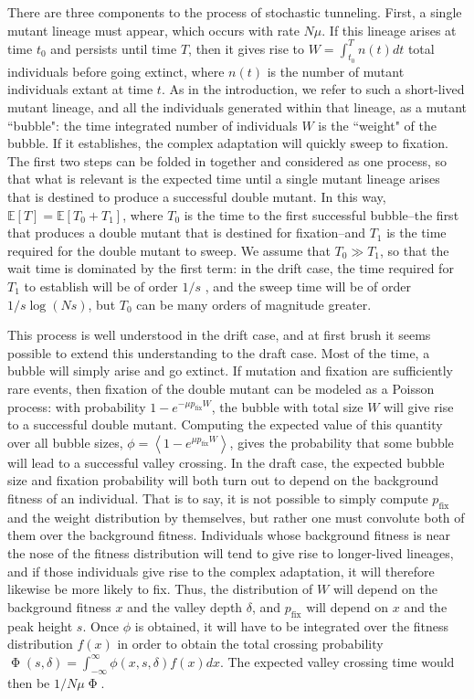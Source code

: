 \documentclass[10pt,twocolumn,twoside]{gsajnl}
\newcommand{\pfix}{p_{\mathrm{fix}}}
\begin{document}
\begin{spacing}{1.5}
There are three components to the process of stochastic tunneling.
First, a single mutant lineage must appear, which occurs with rate $N\mu$.
If this lineage arises at time $t_0$ and persists until time $T$, then it gives rise to $W = \int_{t_0}^T n(t) dt$ total individuals before going extinct, where $n(t)$ is the number of mutant individuals extant at time $t$.
As in the introduction, we refer to such a short-lived mutant lineage, and all the individuals generated within that lineage, as a mutant ``bubble": the time integrated number of individuals $W$ is the ``weight" of the bubble.
If it establishes, the complex adaptation will quickly sweep to fixation.
The first two steps can be folded in together and considered as one process, so that what is relevant is the expected time until a single mutant lineage arises that is destined to produce a successful double mutant.
In this way, $\mathbb{E}\left[ T \right] = \mathbb{E} \left[ T_0 + T_1 \right]$, where $T_0$ is the time to the first successful bubble--the first that produces a double mutant that is destined for fixation--and $T_1$ is the time required for the double mutant to sweep.
We assume that $T_0 \gg T_1$, so that the wait time is dominated by the first term: in the drift case, the time required for $T_1$ to establish will be of order $1/s$ \citep{desai_fisher_2007}, and the sweep time will be of order $1/s \log (Ns)$, but $T_0$ can be many orders of magnitude greater.

This process is well understood in the drift case, and at first brush it seems possible to extend this understanding to the draft case.
Most of the time, a bubble will simply arise and go extinct.
If mutation and fixation are sufficiently rare events, then fixation of the double mutant can be modeled as a Poisson process: with probability $1-e^{-\mu \pfix W}$, the bubble with total size $W$ will give rise to a successful double mutant.
Computing the expected value of this quantity over all bubble sizes, $\phi = \left< 1-e^{\mu \pfix W} \right>$, gives the probability that some bubble will lead to a successful valley crossing.
In the draft case, the expected bubble size and fixation probability will both turn out to depend on the background fitness of an individual.
That is to say, it is not possible to simply compute $\pfix$ and the weight distribution by themselves, but rather one must convolute both of them over the background fitness.
Individuals whose background fitness is near the nose of the fitness distribution will tend to give rise to longer-lived lineages, and if those individuals give rise to the complex adaptation, it will therefore likewise be more likely to fix.
Thus, the distribution of $W$ will depend on the background fitness $x$ and the valley depth $\delta$, and $\pfix$ will depend on $x$ and the peak height $s$.
Once $\phi$ is obtained, it will have to be integrated over the fitness distribution $f(x)$ in order to obtain the total crossing probability $\upPhi(s,\delta) = \int_{-\infty}^\infty \phi(x,s,\delta) f(x) dx$.
The expected valley crossing time would then be $1/N\mu\upPhi$.


\end{spacing}
\end{document}
